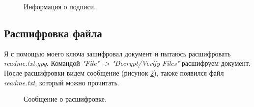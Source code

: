 \documentclass[10pt,a4paper]{report}
\begin{document}
		\begin{figure}[h]
			\caption{Информация о подписи.}
			\label{Img:12}
		\end{figure}
	
	\subsection{Расшифровка файла}	
	Я с помощью моего ключа зашифровал документ и пытаюсь расшифровать \textit{readme.txt.gpg}. Командой \textit{"File" -> "Decrypt/Verify Files"} расшифруем документ. После расшифровки видем сообщение (рисунок \ref{Img:13}), также появился файл \textit{readme.txt}, который можно прочитать. 
	
		\begin{figure}[h]
			\caption{Сообщение о расшифровке.}
			\label{Img:13}
		\end{figure}
	
\end{document}
